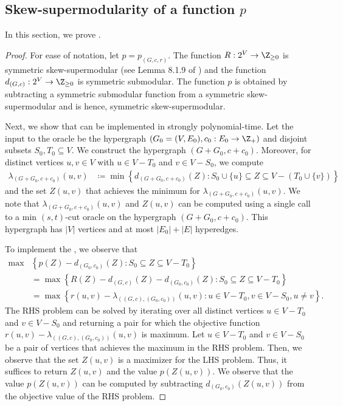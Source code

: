 \subsection{Skew-supermodularity of a function \(p\)}\label{sec:helper-for-p-max-oracle}
In this section, we prove . 
\lempmaxoracle*
\begin{proof}
    For ease of notation, let $p=p_{(G, c, r)}$. 
    The function $R:2^V\rightarrow \Z_{\ge 0}$ is symmetric skew-supermodular (see Lemma 8.1.9 of \cite{Frank-book}) and the function $d_{(G,c)}:2^V\rightarrow \Z_{\ge 0}$ is symmetric submodular. The function $p$ is obtained by subtracting a symmetric submodular function from a symmetric skew-supermodular and is hence, symmetric skew-supermodular. 

    Next, we show that  can be implemented in strongly polynomial-time. 
    Let the input to the oracle be the hypergraph $(G_0=(V, E_0), c_0: E_0\rightarrow \Z_+)$ and disjoint subsets $S_0, T_0\subseteq V$. 
    We construct the hypergraph $(G+G_0, c+c_0)$. Moreover, for distinct vertices $u, v\in V$ with $u\in V-T_0$ and $v\in V-S_0$, we compute  
    \begin{align*}
    \lambda_{(G+G_0, c+c_0)}(u, v)&\coloneqq \min\left\{d_{(G+G_0, c+c_0)}(Z): S_0\cup \{u\}\subseteq Z\subseteq V-(T_0\cup\{v\})\right\} 
    \end{align*}
    and the set $Z(u, v)$ that achieves the minimum for $\lambda_{(G+G_0, c+c_0)}(u, v)$. We note that $\lambda_{(G+G_0, c+c_0)}(u, v)$ and $Z(u,v)$ can be computed using a single call to a min $(s,t)$-cut oracle on the hypergraph $(G+G_0, c+c_0)$. This hypergraph has $|V|$ vertices and at most $|E_0|+|E|$ hyperedges.  

    To implement the , we observe that 
    \begin{align*}
    \max&\left\{p(Z)-d_{(G_0, c_0)}(Z): S_0\subseteq Z\subseteq V-T_0\right\}\\
    &=\max\left\{R(Z)-d_{(G, c)}(Z)-d_{(G_0, c_0)}(Z): S_0\subseteq Z\subseteq V-T_0\right\}\\
    &=\max\left\{r(u, v)-\lambda_{((G, c), (G_0, c_0))}(u, v): u\in V-T_0, v\in V-S_0, u\neq v\right\}. 
    \end{align*}
    The RHS problem can be solved by iterating over all distinct vertices $u\in V-T_0$ and $v\in V-S_0$ and returning a pair for which the objective function $r(u, v)-\lambda_{((G, c), (G_0, c_0))}(u, v)$ is maximum. Let $u\in V-T_0$ and $v\in V-S_0$ be a pair of vertices that achieves the maximum in the RHS problem. Then, we observe that the set $Z(u, v)$ is a maximizer for the LHS problem. Thus, it suffices to return $Z(u, v)$ and the value $p(Z(u, v))$. We observe that the value $p(Z(u, v))$ can be computed by subtracting $d_{(G_0, c_0)}(Z(u,v))$ from the objective value of the RHS problem.


\end{proof}
